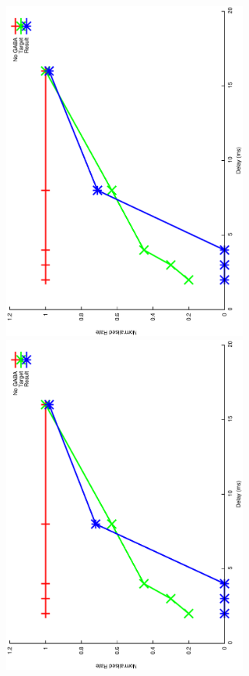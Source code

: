 \documentclass{article}
\begin{document}
\includegraphics[keepaspectratio=true,angle=-90,width=0.6\textwidth]{DS_ClickRecovery_result.2.eps}\clearpage
\includegraphics[keepaspectratio=true,angle=-90,width=0.6\textwidth]{DS_ClickRecovery_result.3.eps}\clearpage
\end{document}
